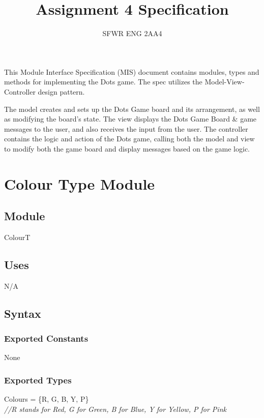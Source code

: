 \documentclass[12pt]{article}
\title{Assignment 4 Specification}
\author{SFWR ENG 2AA4}
\begin{document}
\maketitle
This Module Interface Specification (MIS) document contains modules, types and methods for implementing the Dots game. The spec utilizes the Model-View-Controller design pattern. 

The model creates and sets up the Dots Game board and its arrangement, as well as modifying the board's state. The view displays the Dots Game Board \& game messages to the user, and also receives the input from the user. The controller contains the logic and action of the Dots game, calling both the model and view to modify both the game board and display messages based on the game logic.

\newpage

\section* {Colour Type Module}

\subsection*{Module}

ColourT

\subsection* {Uses}

N/A

\subsection* {Syntax}

\subsubsection* {Exported Constants}

None

\subsubsection* {Exported Types}

Colours = \{R, G, B, Y, P\}\\

\noindent \textit{//R stands for Red, G for Green, B for Blue, Y for
  Yellow, P for Pink}
\end{document}

